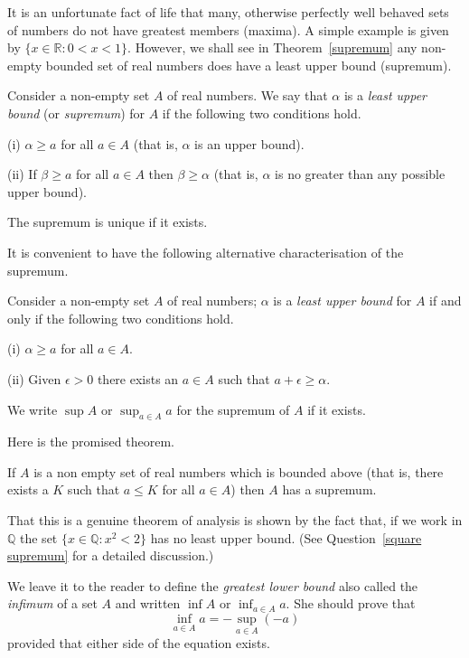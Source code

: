 It is an unfortunate fact of life that many, otherwise
perfectly well behaved sets of numbers do not have
greatest members (maxima). A simple example is
given by $\{x\in{\mathbb R}:0<x<1\}$. However,
we shall see in Theorem~\ref{supremum}
any non-empty bounded set of real numbers does have 
a least upper bound (supremum).
\begin{definition} Consider a non-empty set $A$ of real 
numbers. We say that $\alpha$ is a \emph{least upper bound}
(or \emph{supremum})
for $A$ if the following two conditions hold.

(i) $\alpha\geq a$ for all $a\in A$ (that is, $\alpha$ is
an upper bound).

(ii) If $\beta\geq a$ for all $a\in A$ then $\beta\geq\alpha$
(that is, $\alpha$ is no greater than any possible upper bound).
\end{definition}
\begin{lemma} The supremum is unique if it exists.
\end{lemma}

It is convenient to have the following alternative characterisation
of the supremum.
\begin{lemma} Consider a non-empty set $A$ of real 
numbers; $\alpha$ is a \emph{least upper bound}
for $A$ if and only if
the following two conditions hold.

(i) $\alpha\geq a$ for all $a\in A$.

(ii) Given $\epsilon>0$ there exists an $a\in A$ such that
$a+\epsilon\geq \alpha$.
\end{lemma}
We write $\sup A$ or $\sup_{a\in A}a$ for the supremum 
of $A$ if it exists.

Here is the promised theorem.
\begin{theorem}\label{supremum}
If $A$ is a non empty set of real numbers which is
bounded above (that is, there exists a $K$ such that
$a\leq K$ for all $a\in A$) then $A$ has a supremum.
\end{theorem}
That this is a genuine theorem of analysis is shown
by the fact that, if we work in $\mathbb Q$ the set
$\{x\in\mathbb Q:x^{2}<2\}$ has no least upper bound.
(See Question~\ref{square supremum} for a detailed
discussion.)

We leave it to the reader to define the \emph{greatest
lower bound} also called the \emph{infimum}
of a set $A$ and written $\inf A$ or $\inf_{a\in A}a$.
She should prove that
\[\inf_{a\in A}a=-\sup_{a\in A}(-a)\]
provided that either side of the equation exists.

